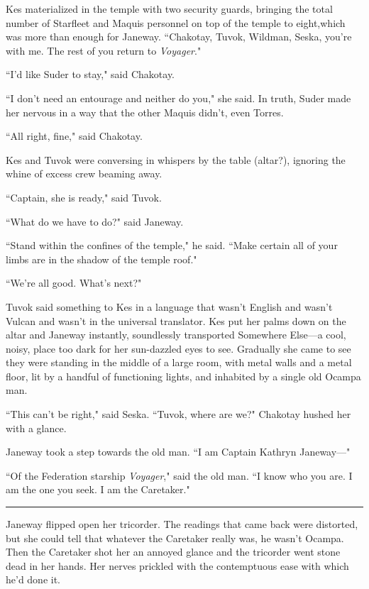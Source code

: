 \documentclass[twoside,letterpaper,12pt]{memoir}
\begin{document}
Kes materialized in the temple with two security guards, bringing the total number of Starfleet and Maquis personnel on top of the temple to eight,which was more than enough for Janeway. ``Chakotay, Tuvok, Wildman, Seska, you're with me. The rest of you return to \textit{Voyager}." 

``I'd like Suder to stay," said Chakotay.

``I don't need an entourage and neither do you," she said. In truth, Suder made her nervous in a way that the other Maquis didn't, even Torres.

``All right, fine," said Chakotay.

Kes and Tuvok were conversing in whispers by the table (altar?), ignoring the whine of excess crew beaming away. 

``Captain, she is ready," said Tuvok. 

``What do we have to do?" said Janeway. 

``Stand within the confines of the temple," he said. ``Make certain all of your limbs are in the shadow of the temple roof." 

``We're all good. What's next?" 

Tuvok said something to Kes in a language that wasn't English and wasn't Vulcan and wasn't in the universal translator. Kes put her palms down on the altar and Janeway instantly, soundlessly transported Somewhere Else---a cool, noisy, place too dark for her sun-dazzled eyes to see. Gradually she came to see they were standing in the middle of a large room, with metal walls and a metal floor, lit by a handful of functioning lights, and inhabited by a single old Ocampa man. 

``This can't be right," said Seska. ``Tuvok, where are we?" Chakotay hushed her with a glance. 

Janeway took a step towards the old man. ``I am Captain Kathryn Janeway---" 

``Of the Federation starship \textit{Voyager}," said the old man. ``I know who you are. I am the one you seek. I am the Caretaker." 

\begin{center}\rule{3cm}{0.4 pt}\end{center} 

Janeway flipped open her tricorder. The readings that came back were distorted, but she could tell that whatever the Caretaker really was, he wasn't Ocampa. Then the Caretaker shot her an annoyed glance and the tricorder went stone dead in her hands. Her nerves prickled with the contemptuous ease with which he'd done it. 
\end{document}
